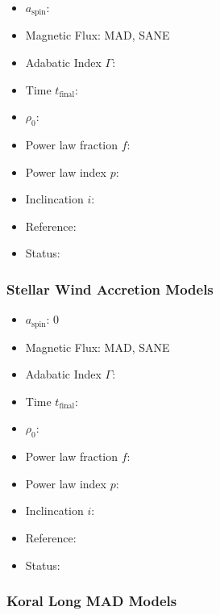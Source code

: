 \documentclass[twocolumn,twocolappendix,tighten,dvipsnames,linenumbers]{aastex63}
\begin{document}
\begin{itemize}
\item $a_\mathrm{spin}$:
\item Magnetic Flux: MAD, SANE
\item Adabatic Index $\Gamma$:
\item Time $t_\mathrm{final}$:
\item $\rho_0$:
\item Power law fraction $f$:
\item Power law index $p$:
\item Inclincation $i$:
\item Reference:
\item Status:
\end{itemize}

\subsubsection{Stellar Wind Accretion Models}

\begin{itemize}
\item $a_\mathrm{spin}$: 0
\item Magnetic Flux: MAD, SANE
\item Adabatic Index $\Gamma$:
\item Time $t_\mathrm{final}$:
\item $\rho_0$:
\item Power law fraction $f$:
\item Power law index $p$:
\item Inclincation $i$:
\item Reference:
\item Status:
\end{itemize}

\subsubsection{Koral Long MAD Models}
\end{document}
